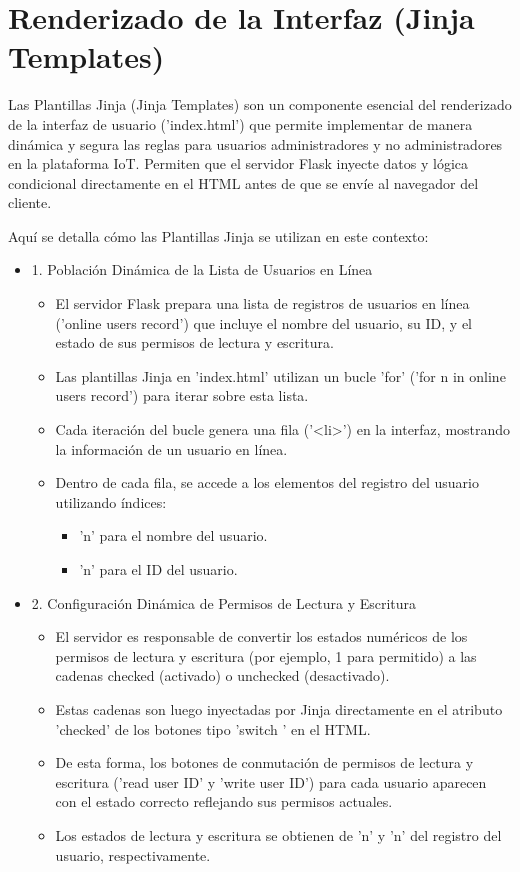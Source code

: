 \documentclass{report}
\begin{document}
\section{Renderizado de la Interfaz (Jinja Templates)}
Las  Plantillas Jinja (Jinja Templates)  son un componente esencial del  renderizado de la interfaz de usuario ('index.html')  que permite implementar 
de manera dinámica y segura las  reglas para usuarios administradores y no administradores  en la plataforma IoT. Permiten que el servidor Flask inyecte 
datos y lógica condicional directamente en el HTML antes de que se envíe al navegador del cliente.

Aquí se detalla cómo las Plantillas Jinja se utilizan en este contexto:
\begin{itemize}
    \item 1. Población Dinámica de la Lista de Usuarios en Línea
    \begin{itemize}
        \item El servidor Flask prepara una lista de registros de usuarios en línea ('online users record') que incluye el nombre del usuario, 
              su ID, y el estado de sus permisos de lectura y escritura.
        \item Las plantillas Jinja en 'index.html' utilizan un bucle 'for' ('for n in online users record') para iterar sobre esta lista.
        \item Cada iteración del bucle genera una fila ('<li>') en la interfaz, mostrando la información de un usuario en línea.
        \item Dentro de cada fila, se accede a los elementos del registro del usuario utilizando índices:
        \begin{itemize}
            \item 'n' para el  nombre del usuario.
            \item 'n' para el  ID del usuario.
        \end{itemize}
    \end{itemize}

    \item 2. Configuración Dinámica de Permisos de Lectura y Escritura
    \begin{itemize}
        \item El servidor es responsable de convertir los estados numéricos de los permisos de lectura y escritura (por ejemplo, 1 para permitido) a 
              las cadenas checked (activado) o unchecked (desactivado).
        \item Estas cadenas son luego inyectadas por Jinja directamente en el atributo 'checked' de los botones tipo  'switch ' en el HTML.
        \item De esta forma, los botones de conmutación de permisos de lectura y escritura ('read user ID' y 'write user ID') para cada usuario 
              aparecen con el estado correcto reflejando sus permisos actuales.
        \item Los estados de lectura y escritura se obtienen de 'n' y 'n' del registro del usuario, respectivamente.
    \end{itemize}


\end{itemize}
\end{document}
